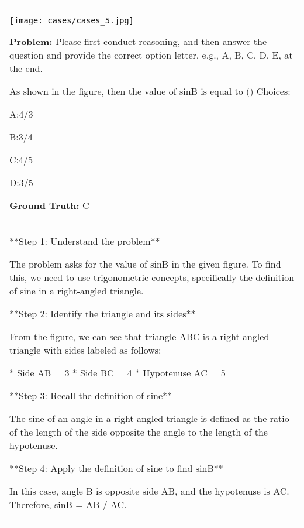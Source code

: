 \begin{table*}[htbp]
    \centering
    \renewcommand{\arraystretch}{1.2} 
    \setlength{\tabcolsep}{8pt} 
    \begin{tabular}{p{14cm}}
        \centering
        \texttt{[image: cases/cases\_5.jpg]}
        
        \begin{tcolorbox}[colback=gray!5, colframe=gray!40, sharp corners, width=\linewidth, boxrule=0.5mm]
        \small
        \textbf{Problem: }
        Please first conduct reasoning, and then answer the question and provide the correct option letter, e.g., A, B, C, D, E, at the end.
        
        As shown in the figure, then the value of sinB is equal to ()
        Choices:
        
        A:4/3
        
        B:3/4
        
        C:4/5
        
        D:3/5

        \textbf{Ground Truth:} C
        \end{tcolorbox}  %
        \begin{tcolorbox}[colback=gray!5, colframe=gray!40, sharp corners, width=\linewidth, boxrule=0.5mm]
            \small
            \textbf{LLaMA-3.2-Vision-11B:}
            \\
**Step 1: Understand the problem**

The problem asks for the value of sinB in the given figure. To find this, we need to use trigonometric concepts, specifically the definition of sine in a right-angled triangle.

**Step 2: Identify the triangle and its sides**

From the figure, we can see that triangle ABC is a right-angled triangle with sides labeled as follows:

*   Side AB = 3
*   Side BC = 4
*   Hypotenuse AC = 5

**Step 3: Recall the definition of sine**

The sine of an angle in a right-angled triangle is defined as the ratio of the length of the side opposite the angle to the length of the hypotenuse.

**Step 4: Apply the definition of sine to find sinB**

In this case, angle B is opposite side AB, and the hypotenuse is AC. Therefore, sinB = AB / AC.


\end{tcolorbox}
\end{tabular}
\end{table*}
